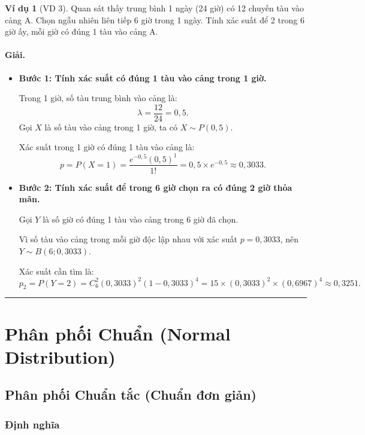 \documentclass[12pt,a4paper]{article}
\theoremstyle{definition}
\newtheorem{vidu}{Ví dụ}[section]
\begin{document}
\begin{vidu}[VD 3]
Quan sát thấy trung bình 1 ngày (24 giờ) có 12 chuyến tàu vào cảng A. Chọn ngẫu nhiên liên tiếp 6 giờ trong 1 ngày. Tính xác suất để 2 trong 6 giờ ấy, mỗi giờ có đúng 1 tàu vào cảng A.

\paragraph{Giải.}
\begin{itemize}
    \item \textbf{Bước 1: Tính xác suất có đúng 1 tàu vào cảng trong 1 giờ.}
    
    Trong 1 giờ, số tàu trung bình vào cảng là:
    \[
    \lambda = \frac{12}{24} = 0{,}5.
    \]
    Gọi $X$ là số tàu vào cảng trong 1 giờ, ta có $X \sim P(0{,}5)$.
    
    Xác suất trong 1 giờ có đúng 1 tàu vào cảng là:
    \[
    p = P(X = 1) = \frac{e^{-0{,}5} (0{,}5)^1}{1!} = 0{,}5 \times e^{-0{,}5} \approx 0{,}3033.
    \]

    \item \textbf{Bước 2: Tính xác suất để trong 6 giờ chọn ra có đúng 2 giờ thỏa mãn.}
    
    Gọi $Y$ là số giờ có đúng 1 tàu vào cảng trong 6 giờ đã chọn.
    
    Vì số tàu vào cảng trong mỗi giờ độc lập nhau với xác suất $p = 0{,}3033$, nên $Y \sim B(6; 0{,}3033)$.
    
    Xác suất cần tìm là:
    \[
    p_2 = P(Y = 2) = C_6^2 (0{,}3033)^2 (1 - 0{,}3033)^4 = 15 \times (0{,}3033)^2 \times (0{,}6967)^4 \approx 0{,}3251.
    \]
\end{itemize}
\end{vidu}

\vspace{1.5em}
\hrule
\vspace{1.5em}

\section{Phân phối Chuẩn (Normal Distribution)}

\subsection{Phân phối Chuẩn tắc (Chuẩn đơn giản)}

\subsubsection{Định nghĩa}
\end{document}
